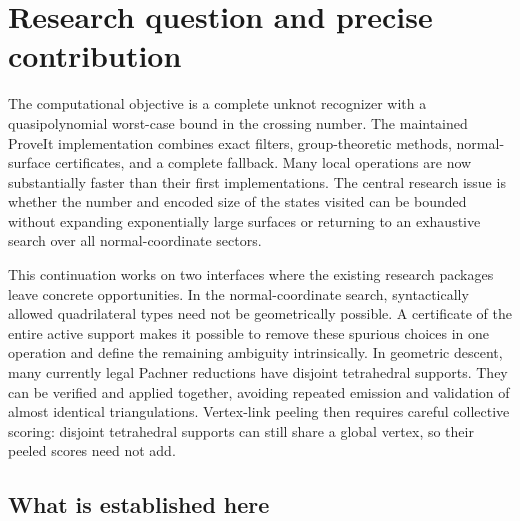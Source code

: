 \section{Research question and precise contribution}

The computational objective is a complete unknot recognizer with a
quasipolynomial worst-case bound in the crossing number. The maintained
ProveIt implementation combines exact filters, group-theoretic methods,
normal-surface certificates, and a complete fallback. Many local operations
are now substantially faster than their first implementations. The central
research issue is whether the number and encoded size of the states visited
can be bounded without expanding exponentially large surfaces or returning
to an exhaustive search over all normal-coordinate sectors.

This continuation works on two interfaces where the existing research
packages leave concrete opportunities. In the normal-coordinate search,
syntactically allowed quadrilateral types need not be geometrically
possible. A certificate of the entire active support makes it possible to
remove these spurious choices in one operation and define the remaining
ambiguity intrinsically. In geometric descent, many currently legal
Pachner reductions have disjoint tetrahedral supports. They can be verified
and applied together, avoiding repeated emission and validation of almost
identical triangulations. Vertex-link peeling then requires careful
collective scoring: disjoint tetrahedral supports can still share a global
vertex, so their peeled scores need not add.

\subsection{What is established here}

